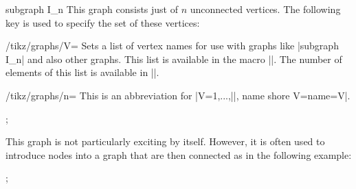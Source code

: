 \begin{graph}{subgraph I\_n}
  This graph consists just of $n$ unconnected vertices. The following
  key is used to specify the set of these vertices:
  \begin{key}{/tikz/graphs/V=}
    Sets a list of vertex names for use with graphs like
    |subgraph I_n| and also other graphs. This list is available in
    the macro |\tikzgraphV|. The number of elements of this list is
    available in |\tikzgraphVnum|.
  \end{key}
  \begin{key}{/tikz/graphs/n=}
    This is an abbreviation for
    |V={1,...,||}, name shore V={name=V}|.
  \end{key}
\begin{codeexample}[]
\tikz {};    
\end{codeexample}
  This graph is not particularly exciting by itself. However, it is
  often used to introduce nodes into a graph that are then connected
  as in the following example:
\begin{codeexample}[]
\tikz {};    
\end{codeexample}
\end{graph}


